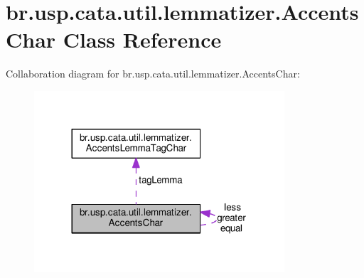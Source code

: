\hypertarget{classbr_1_1usp_1_1cata_1_1util_1_1lemmatizer_1_1_accents_char}{\section{br.\+usp.\+cata.\+util.\+lemmatizer.\+Accents\+Char Class Reference}
\label{classbr_1_1usp_1_1cata_1_1util_1_1lemmatizer_1_1_accents_char}
}


Collaboration diagram for br.\+usp.\+cata.\+util.\+lemmatizer.\+Accents\+Char\+:\nopagebreak
\begin{figure}[H]
\begin{center}
\leavevmode
\includegraphics[width=264pt]{classbr_1_1usp_1_1cata_1_1util_1_1lemmatizer_1_1_accents_char__coll__graph}
\end{center}
\end{figure}
